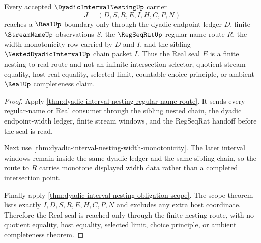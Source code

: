 \begin{theorem}
\label{thm:dyadic-interval-nesting-real-seal-handoff}
Every accepted $\DyadicIntervalNestingUp$ carrier
$$
J=(D,S,R,E,I,H,C,P,N)
$$
reaches a $\RealUp$ boundary only through the dyadic endpoint ledger $D$, finite $\StreamNameUp$ observations $S$, the $\RegSeqRatUp$ regular-name route $R$, the width-monotonicity row carried by $D$ and $I$, and the sibling $\NestedDyadicIntervalUp$ chain packet $I$. Thus the Real seal $E$ is a finite nesting-to-real route and not an infinite-intersection selector, quotient stream equality, host real equality, selected limit, countable-choice principle, or ambient $\RealUp$ completeness claim.
\end{theorem}
\begin{proof}
Apply \autoref{thm:dyadic-interval-nesting-regular-name-route}. It sends every regular-name or Real consumer through the sibling nested chain, the dyadic endpoint-width ledger, finite stream windows, and the RegSeqRat handoff before the seal is read.

Next use \autoref{thm:dyadic-interval-nesting-width-monotonicity}. The later interval windows remain inside the same dyadic ledger and the same sibling chain, so the route to $R$ carries monotone displayed width data rather than a completed intersection point.

Finally apply \autoref{thm:dyadic-interval-nesting-obligation-scope}. The scope theorem lists exactly $I,D,S,R,E,H,C,P,N$ and excludes any extra host coordinate. Therefore the Real seal is reached only through the finite nesting route, with no quotient equality, host equality, selected limit, choice principle, or ambient completeness theorem.
\end{proof}

